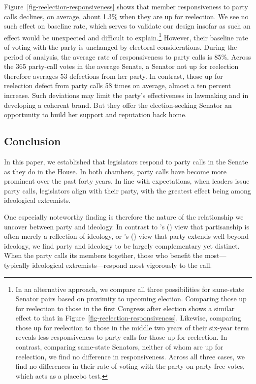 \documentclass[12pt]{article}
\def\citeapos#1{\citeauthor{#1}'s (\citeyear{#1})} %
\begin{document}
Figure~\ref{fig-reelection-responsiveness} shows that member responsiveness to party calls declines, on average, about 1.3\% when they are up for reelection.  We see no such effect on baseline rate, which serves to validate our design insofar as such an effect would be unexpected and difficult to explain.\footnote{\doublespacing\normalsize  In an alternative approach, we compare all three possibilities for same-state Senator pairs based on proximity to upcoming election.  Comparing those up for reelection to those in the first Congress after election shows a similar effect to that in Figure~\ref{fig-reelection-responsiveness}.  Likewise, comparing those up for reelection to those in the middle two years of their six-year term reveals less responsiveness to party calls for those up for reelection.  In contrast, comparing same-state Senators, neither of whom are up for reelection, we find no difference in responsiveness.  Across all three cases, we find no differences in their rate of voting with the party on party-free votes, which acts as a placebo test.}  However, their baseline rate of voting with the party is unchanged by electoral considerations.  During the period of analysis, the average rate of responsiveness to party calls is 85\%. Across the 365 party-call votes in the average Senate, a Senator not up for reelection therefore averages 53 defections from her party.  In contrast, those up for reelection defect from party calls 58 times on average, almost a ten percent increase.  Such deviations may limit the party's effectiveness in lawmaking and in developing a coherent brand.  But they offer the election-seeking Senator an opportunity to build her support and reputation back home.

\subsection*{Conclusion}

In this paper, we established that legislators respond to party calls in the Senate as they do in the House. In both chambers, party calls have become more prominent over the past forty years.  In line with expectations, when leaders issue party calls, legislators align with their party, with the greatest effect being among ideological extremists.

One especially noteworthy finding is therefore the nature of the relationship we uncover between party and ideology.  In contrast to \citeapos{Krehbiel:1993} view that partisanship is often merely a reflection of ideology, or \citeapos{Lee:2009} view that party extends well beyond ideology, we find party and ideology to be largely complementary yet distinct.  When the party calls its members together, those who benefit the most---typically ideological extremists---respond most vigorously to the call.
\end{document}
